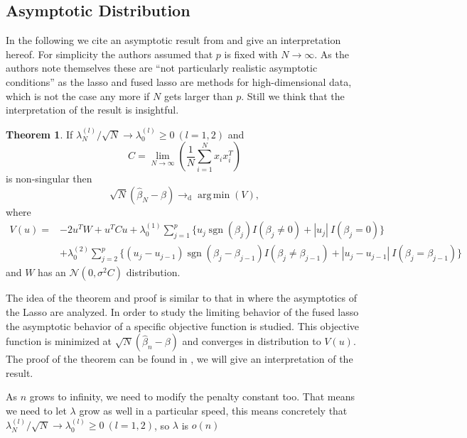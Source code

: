 \documentclass{article}
\theoremstyle{definition}
\newtheorem{theorem}{Theorem}
\DeclareMathOperator*{\argmin}{arg\,min}
\DeclareMathOperator*{\sgn}{sgn}
\begin{document}
\subsection{Asymptotic Distribution}
In the following we cite an asymptotic result from \citet{fused} and give an interpretation hereof.
For simplicity the authors assumed that $p$ is fixed with $N \rightarrow \infty$. As the authors note themselves these are ``not particularly realistic asymptotic conditions'' as the lasso and fused lasso are methods for high-dimensional data, which is not the case any more if $N$ gets larger than $p$. Still we think that the interpretation of the result is insightful.

\begin{theorem}
	If $\lambda_N^{(l)}/\sqrt{N} \rightarrow \lambda_0^{(l)} \geq 0 \  (l=1,2)$ and
	\begin{equation*}
	C = \lim\limits_{N \rightarrow \infty}{(\frac{1}{N} \sum_{i=1}^{N}x_i x_i^T)}
	\end{equation*}
	is non-singular then
	\begin{equation*}
	\sqrt{N}(\hat{\beta}_N - \beta) \rightarrow_{\text{d}} \argmin(V),
	\end{equation*}
	where
	\begin{align*}
	V(u) = &-2u^T W + u^T Cu + \lambda_0^{(1)} \sum_{j=1}^{p} \{u_j \sgn(\beta_j)I(\beta_j \neq 0) + |u_j|\ I(\beta_j=0) \} \\
	&+ \lambda_0^{(2)} \sum_{j=2}^{p} \{(u_j - u_{j-1}) \sgn(\beta_j - \beta_{j-1})I(\beta_j \neq \beta_{j-1}) + |u_j-u_{j-1}|\ I(\beta_j=\beta_{j-1}) \} 
	\end{align*}
	and $W$ has an $\mathcal{N}(0,\sigma^2 C)$ distribution.
\end{theorem}

The idea of the theorem and proof is similar to that in \citep{asymptoticslasso} where the asymptotics of the Lasso are analyzed. In order to study the limiting behavior of the fused lasso the asymptotic behavior of a specific objective function is studied. This objective function is minimized at $\sqrt{N}(\hat{\beta}_n-\beta)$ and converges in distribution to $V(u)$. The proof of the theorem can be found in \citep{fused}, we will give an interpretation of the result.
\smallskip

\noindent As $n$ grows to infinity, we need to modify the penalty constant too. That means we need to let $\lambda$ grow as well in a particular speed, this means concretely that $\lambda_N^{(l)}/\sqrt{N} \rightarrow \lambda_0^{(l)} \geq 0 \  (l=1,2)$, so $\lambda$ is $o(n)$ 
\smallskip
\end{document}
